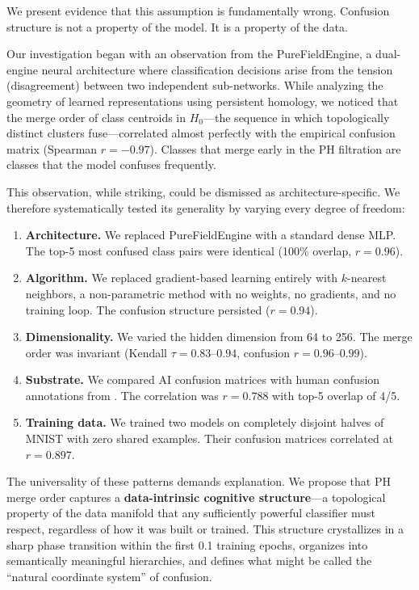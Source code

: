 \documentclass[11pt,a4paper]{article}
\begin{document}
We present evidence that this assumption is fundamentally wrong. Confusion structure is not a property of the model. It is a property of the data.

Our investigation began with an observation from the PureFieldEngine, a dual-engine neural architecture where classification decisions arise from the tension (disagreement) between two independent sub-networks. While analyzing the geometry of learned representations using persistent homology, we noticed that the merge order of class centroids in $H_0$---the sequence in which topologically distinct clusters fuse---correlated almost perfectly with the empirical confusion matrix (Spearman $r = -0.97$). Classes that merge early in the PH filtration are classes that the model confuses frequently.

This observation, while striking, could be dismissed as architecture-specific. We therefore systematically tested its generality by varying every degree of freedom:

\begin{enumerate}
  \item \textbf{Architecture.} We replaced PureFieldEngine with a standard dense MLP. The top-5 most confused class pairs were identical (100\% overlap, $r = 0.96$).

  \item \textbf{Algorithm.} We replaced gradient-based learning entirely with $k$-nearest neighbors, a non-parametric method with no weights, no gradients, and no training loop. The confusion structure persisted ($r = 0.94$).

  \item \textbf{Dimensionality.} We varied the hidden dimension from 64 to 256. The merge order was invariant (Kendall $\tau = 0.83$--$0.94$, confusion $r = 0.96$--$0.99$).

  \item \textbf{Substrate.} We compared AI confusion matrices with human confusion annotations from \citet{peterson2019}. The correlation was $r = 0.788$ with top-5 overlap of 4/5.

  \item \textbf{Training data.} We trained two models on completely disjoint halves of MNIST with zero shared examples. Their confusion matrices correlated at $r = 0.897$.
\end{enumerate}

The universality of these patterns demands explanation. We propose that PH merge order captures a \textbf{data-intrinsic cognitive structure}---a topological property of the data manifold that any sufficiently powerful classifier must respect, regardless of how it was built or trained. This structure crystallizes in a sharp phase transition within the first 0.1 training epochs, organizes into semantically meaningful hierarchies, and defines what might be called the ``natural coordinate system'' of confusion.
\end{document}
